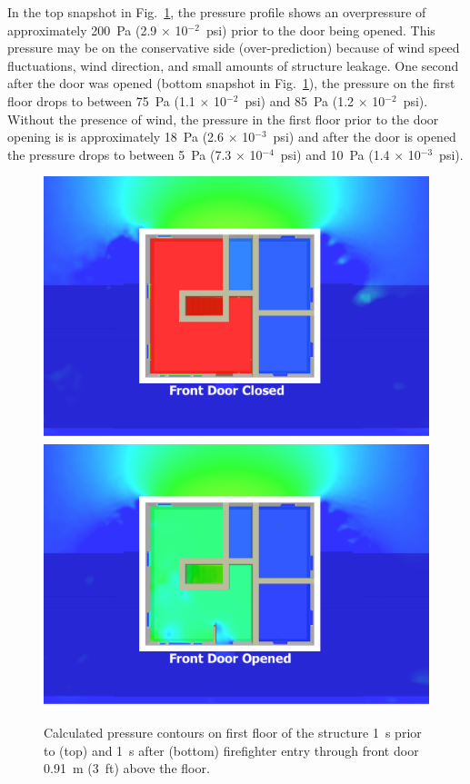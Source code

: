 \documentclass[12pt,oneside]{book}
\begin{document}
In the top snapshot in Fig.~\ref{fig:pressure_slices}, the pressure profile shows an overpressure of approximately 200~Pa (2.9 $\times$ 10$^{-2}$~psi) prior to the door being opened. This pressure may be on the conservative side (over-prediction) because of wind speed fluctuations, wind direction, and small amounts of structure leakage. One second after the door was opened (bottom snapshot in Fig.~\ref{fig:pressure_slices}), the pressure on the first floor drops to between 75~Pa (1.1 $\times$ 10$^{-2}$~psi) and 85~Pa (1.2 $\times$ 10$^{-2}$~psi). Without the presence of wind, the pressure in the first floor prior to the door opening is is approximately 18~Pa (2.6 $\times$ 10$^{-3}$~psi) and after the door is opened the pressure drops to between 5~Pa (7.3 $\times$ 10$^{-4}$~psi) and 10~Pa (1.4 $\times$ 10$^{-3}$~psi).

\clearpage

\begin{figure}[!ht]
\includegraphics[trim = 1in 1in 1in 1in, clip=true, width=.55\textwidth]{../Figures/pressure_slice_99s}
 \\
\includegraphics[trim = 1in 1in 1in 1in, clip=true, width=.55\textwidth]{../Figures/pressure_slice_101s}

\caption[Calculated pressure on first floor 1~s before and after front door opens]
{Calculated pressure contours on first floor of the structure 1~s prior to (top) and 1~s after (bottom) firefighter entry through front door 0.91~m (3~ft) above the floor.}
\label{fig:pressure_slices}
\end{figure}
\end{document}
